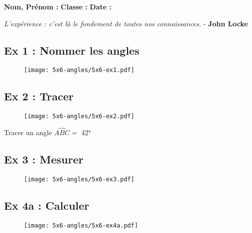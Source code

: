 



\textbf{Nom, Prénom :} \hspace{8cm} \textbf{Classe :} \hspace{3cm} \textbf{Date :}\\

\begin{center}
  \textit{L’expérience : c’est là le fondement de toutes nos connaissances.}  - \textbf{John Locke}
\end{center}

\subsection*{Ex 1 : Nommer les angles}

\begin{figure}[H]
  \centering
  \texttt{[image: 5x6-angles/5x6-ex1.pdf]}
\end{figure} 

\Pointilles[1]

\begin{multicols}{2}
\subsection*{Ex 2 : Tracer}

\begin{figure}[H]
  \centering
  \texttt{[image: 5x6-angles/5x6-ex2.pdf]}
\end{figure} 

Tracer un angle $\widehat{ABC} =$ 42° \columnbreak

\subsection*{Ex 3 : Mesurer}

\begin{figure}[H]
  \centering
  \texttt{[image: 5x6-angles/5x6-ex3.pdf]}
\end{figure} 

\Pointilles[1]

\end{multicols}

\subsection*{Ex 4a : Calculer}

\begin{figure}[H]
  \centering
  \texttt{[image: 5x6-angles/5x6-ex4a.pdf]}
\end{figure} 

